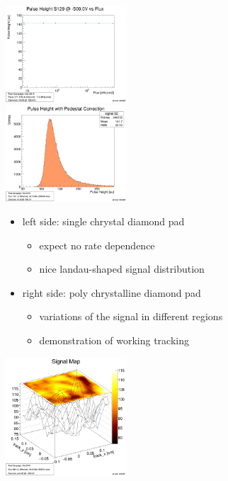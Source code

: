 \documentclass[9pt]{beamer}
\begin{document}
\begin{frame}
	\begin{minipage}{4.5cm}
		\centering
		\includegraphics[width=4.5cm]{SinglePH}\\
		\includegraphics[width=4.5cm]{Landau}\\
	\end{minipage}
	\begin{minipage}{6.5cm}
		\begin{itemize}
			\item left side: single chrystal diamond pad
			\begin{itemize}
				\item expect no rate dependence
				\item nice landau-shaped signal distribution
			\end{itemize}
			\item right side: poly chrystalline diamond pad
			\begin{itemize}
				\item variations of the signal in different regions
				\item demonstration of working tracking
			\end{itemize}
		\end{itemize}
		\hspace*{1cm}\includegraphics[width=4.5cm]{2DMap}
	\end{minipage}
\end{frame}
\end{document}
